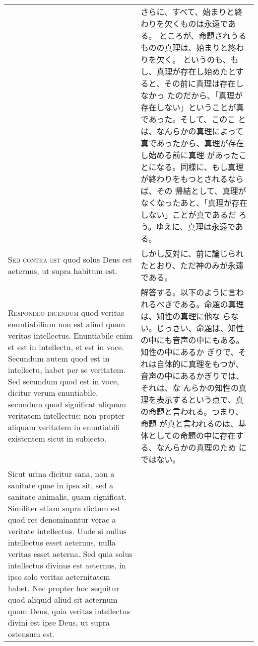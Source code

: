\documentclass[10pt]{jsarticle} %
\begin{document}
\begin{longtable}{p{21em}p{21em}}
&

さらに、すべて、始まりと終わりを欠くものは永遠である。
ところが、命題されうるものの真理は、始まりと終わりを欠く。
というのも、もし、真理が存在し始めたとすると、その前に真理は存在しなかっ
 たのだから、「真理が存在しない」ということが真であった。そして、このこ
 とは、なんらかの真理によって真であったから、真理が存在し始める前に真理
 があったことになる。同様に、もし真理が終わりをもつとされるならば、その
 帰結として、真理がなくなったあと、「真理が存在しない」ことが真であるだ
 ろう。ゆえに、真理は永遠である。

\\



{\scshape Sed contra est} quod solus Deus est
 aeternus, ut supra habitum est.


&

しかし反対に、前に論じられたとおり、ただ神のみが永遠である。

\\



{\scshape Respondeo dicendum} quod veritas
 enuntiabilium non est aliud quam veritas intellectus. Enuntiabile enim
 et est in intellectu, et est in voce. Secundum autem quod est in
 intellectu, habet per se veritatem. Sed secundum quod est in voce,
 dicitur verum enuntiabile, secundum quod significat aliquam veritatem
 intellectus; non propter aliquam veritatem in enuntiabili existentem
 sicut in subiecto. 


&

解答する。以下のように言われるべきである。命題の真理は、知性の真理に他な
らない。じっさい、命題は、知性の中にも音声の中にもある。知性の中にあるか
ぎりで、それは自体的に真理をもつが、音声の中にあるかぎりでは、それは、な
んらかの知性の真理を表示するという点で、真の命題と言われる。つまり、命題
が真と言われるのは、基体としての命題の中に存在する、なんらかの真理のため
にではない。

\\


Sicut urina dicitur sana, non a sanitate quae in
 ipsa sit, sed a sanitate animalis, quam significat. Similiter etiam
 supra dictum est quod res denominantur verae a veritate
 intellectus. Unde si nullus intellectus esset aeternus, nulla veritas
 esset aeterna. Sed quia solus intellectus divinus est aeternus, in ipso
 solo veritas aeternitatem habet. Nec propter hoc sequitur quod aliquid
 aliud sit aeternum quam Deus, quia veritas intellectus divini est ipse
 Deus, ut supra ostensum est.


\end{longtable}
\end{document}

